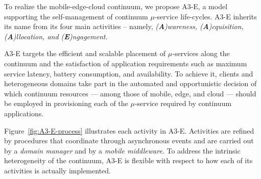 To realize the mobile-edge-cloud continuum, we propose A3-E, a model supporting the self-management of continuum $\mu$-service life-cycles. A3-E inherits its name from its four main activities -- namely, \textit{(\textbf{A})wareness, (\textbf{A})cquisition, (\textbf{A})llocation, and (\textbf{E})ngagement}. 

A3-E targets 
the efficient and scalable placement of $\mu$-services along the continuum and the satisfaction of application requirements such as maximum service latency, battery consumption, and availability. 
To achieve it, clients and heterogeneous domains take part in the automated and opportunistic decision of which continuum resources --- among those of mobile, edge, and cloud --- should be employed in provisioning each of the $\mu$-service required by continuum applications. 




Figure~\ref{fig:A3-E-process} illustrates each activity in A3-E. 
Activities are refined by procedures that coordinate through asynchronous events and are carried out by a \textit{domain manager} and by a \textit{mobile middleware}. 
To address the intrinsic heterogeneity of the continuum, A3-E is flexible with respect to how each of its activities is actually implemented. 



